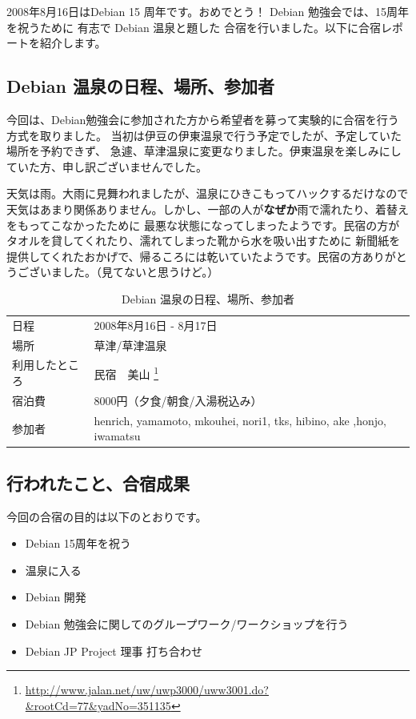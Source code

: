 \documentclass[mingoth,a4paper]{jsarticle}
\begin{document}
\label{sec:debian-onsen}

2008年8月16日はDebian 15 周年です。おめでとう！ Debian 勉強会では、15周年を祝うために
有志で Debian 温泉と題した 合宿を行いました。以下に合宿レポートを紹介します。

\subsection{Debian 温泉の日程、場所、参加者}
今回は、Debian勉強会に参加された方から希望者を募って実験的に合宿を行う方式を取りました。
当初は伊豆の伊東温泉で行う予定でしたが、予定していた場所を予約できず、
急遽、草津温泉に変更なりました。伊東温泉を楽しみにしていた方、申し訳ございませんでした。

天気は雨。大雨に見舞われましたが、温泉にひきこもってハックするだけなので
天気はあまり関係ありません。しかし、一部の人が{\bf なぜか}雨で濡れたり、着替えをもってこなかったために
最悪な状態になってしまったようです。民宿の方がタオルを貸してくれたり、濡れてしまった靴から水を吸い出すために
新聞紙を提供してくれたおかげで、帰るころには乾いていたようです。民宿の方ありがとうございました。（見てないと思うけど。）

\begin{table}[h]
 \begin{center}
 {
   \begin{tabular}{l|l} \hline
     日程 & 2008年8月16日 - 8月17日  \\
     場所 & 草津/草津温泉 \\
     利用したところ & 民宿　美山 \footnote{\url{http://www.jalan.net/uw/uwp3000/uww3001.do?&rootCd=77&yadNo=351135}}\\
     宿泊費 & 8000円（夕食/朝食/入湯税込み）\\
     参加者 & henrich, yamamoto, mkouhei, nori1, tks, hibino, ake ,honjo, iwamatsu\\
   \end{tabular}
 }
 \caption{Debian 温泉の日程、場所、参加者}
 \label{onsen-data}
 \end{center}
\end{table}

\subsection{行われたこと、合宿成果}

今回の合宿の目的は以下のとおりです。

\begin{itemize}
\item Debian 15周年を祝う
\item 温泉に入る
\item Debian 開発
\item Debian 勉強会に関してのグループワーク/ワークショップを行う
\item Debian JP Project 理事 打ち合わせ
\end{itemize}
\end{document}
